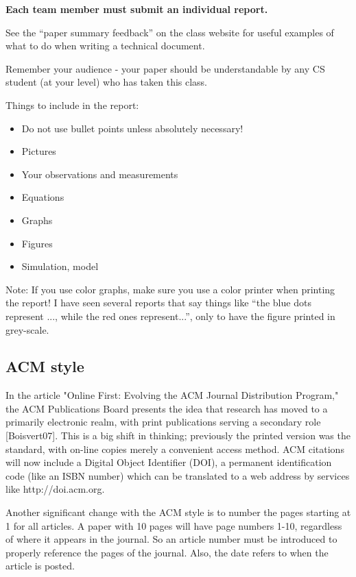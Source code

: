 \documentclass[final]{ieee}
\begin{document}
{\bf Each team member must submit an individual report.}

See the ``paper summary feedback'' on the class website for
useful examples of what to do when writing a technical document.


Remember your audience - your paper should be understandable by any CS
student (at your level) who has taken this class.

Things to include in the report:
\begin{itemize}
    \item Do not use bullet points unless absolutely necessary!
    \item Pictures
    \item Your observations and measurements
    \item  Equations
    \item Graphs
    \item Figures
    \item Simulation, model 
\end{itemize}

Note: If you use color graphs, make sure you use a color printer when
printing the report! I have seen several reports that say things like
``the blue dots represent ..., while the red ones represent...'', only to
have the figure printed in grey-scale.



\subsection{ACM style}
In the article "Online First: Evolving the ACM Journal Distribution
Program," the ACM Publications Board presents the idea that research has
moved to a primarily electronic realm, with print publications serving a
secondary role [Boisvert07]. This is a big shift in thinking; previously
the printed version was the standard, with on-line copies merely a
convenient access method. ACM citations will now include a Digital
Object Identifier (DOI), a permanent identification code (like an ISBN
number) which can be translated to a web address by services like
http://doi.acm.org.


Another significant change with the ACM style is to number the pages
starting at 1 for all articles. A paper with 10 pages will have page
numbers 1-10, regardless of where it appears in the journal. So an
article number must be introduced to properly reference the pages of the
journal. Also, the date refers to when the article is posted.
\end{document}
